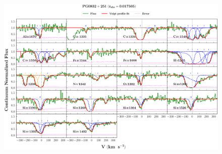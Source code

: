 \documentclass[12pt,draft]{report}
\begin{document}
\begin{landscape}

\begin{figure}
    \centering
    \vspace{-20mm}
    \hspace*{-35mm}
    \includegraphics[width=1.25\linewidth]{System-Plots/PG0832+251_z=0.017505_sys_plot.png}
\end{figure}

\end{landscape}
\end{document}

